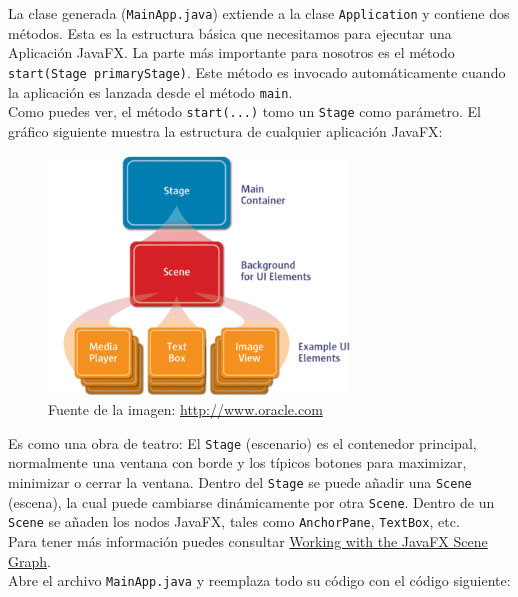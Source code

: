 La clase generada (\textcolor{codigo}{\texttt{MainApp.java}}) extiende a la clase \textcolor{codigo}{\texttt{Application}} y contiene dos métodos. Esta es la estructura básica que necesitamos para ejecutar una Aplicación JavaFX. La parte más importante para nosotros es el método \textcolor{codigo}{\texttt{start(Stage primaryStage)}}. Este método es invocado automáticamente cuando la aplicación es lanzada desde el método \textcolor{codigo}{\texttt{main}}.\\
Como puedes ver, el método \textcolor{codigo}{\texttt{start(...)}} tomo un \textcolor{codigo}{\texttt{Stage}} como parámetro. El gráfico siguiente muestra la estructura de cualquier aplicación JavaFX:
\begin{figure}[H]
	\includegraphics[width=8cm]{img/javafx-hierarchy}
	\caption*{Fuente de la imagen: \textcolor{azul}{\href{http://www.oracle.com}{http://www.oracle.com}}}
\end{figure}

Es como una obra de teatro: El \textcolor{codigo}{\texttt{Stage}} (escenario) es el contenedor principal, normalmente una ventana con borde y los típicos botones para maximizar, minimizar o cerrar la ventana. Dentro del \textcolor{codigo}{\texttt{Stage}} se puede añadir una \textcolor{codigo}{\texttt{Scene}} (escena), la cual puede cambiarse dinámicamente por otra \textcolor{codigo}{\texttt{Scene}}. Dentro de un \textcolor{codigo}{\texttt{Scene}} se añaden los nodos JavaFX, tales como \textcolor{codigo}{\texttt{AnchorPane}}, \textcolor{codigo}{\texttt{TextBox}}, etc.\\
Para tener más información puedes consultar \textcolor{azul}{\href{https://docs.oracle.com/javase/8/javafx/scene-graph-tutorial/scenegraph.htm}{Working with the JavaFX Scene Graph}}.\\
Abre el archivo \textcolor{codigo}{\texttt{MainApp.java}} y reemplaza todo su código con el código siguiente:

